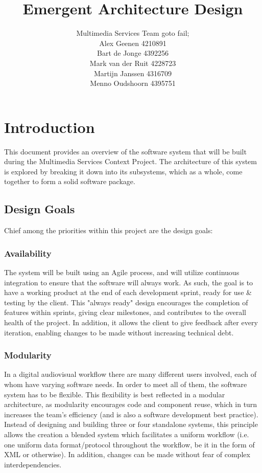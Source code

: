 \documentclass[11pt,twoside,a4paper]{article}
\title{Emergent Architecture Design}
\author{
  Multimedia Services Team goto fail;\\
  Alex Geenen 4210891\\
  Bart de Jonge 4392256\\
  Mark van der Ruit 4228723\\
  Martijn Janssen 4316709\\
  Menno Oudshoorn 4395751
}
\begin{document}
\maketitle
\clearpage

\tableofcontents
\clearpage

\section{Introduction} \label{sec:intro}
This document provides an overview of the software system that will be built during the Multimedia Services Context Project. The architecture of this system is explored by breaking it down into its subsystems, which as a whole, come together to form a solid software package. 

\subsection{Design Goals}
Chief among the priorities within this project are the design goals:

\subsubsection{Availability}
The system will be built using an Agile process, and will utilize continuous integration to ensure that the software will always work. As such, the goal is to have a working product at the end of each development sprint, ready for use \& testing by the client. This "always ready" design encourages the completion of features within sprints, giving clear milestones, and contributes to the overall health of the project. In addition, it allows the client to give feedback after every iteration, enabling changes to be made without increasing technical debt.

\subsubsection{Modularity}
In a digital audiovisual workflow there are many different users involved, each of whom have varying software needs. In order to meet all of them, the software system has to be flexible. This flexibility is best reflected in a modular architecture, as modularity encourages code and component reuse, which in turn increases the team's efficiency (and is also a software development best practice). Instead of designing and building three or four standalone systems, this principle allows the creation a blended system which facilitates a uniform workflow (i.e. one uniform data format/protocol throughout the workflow, be it in the form of XML or otherwise). In addition, changes can be made without fear of complex interdependencies.
\end{document}
